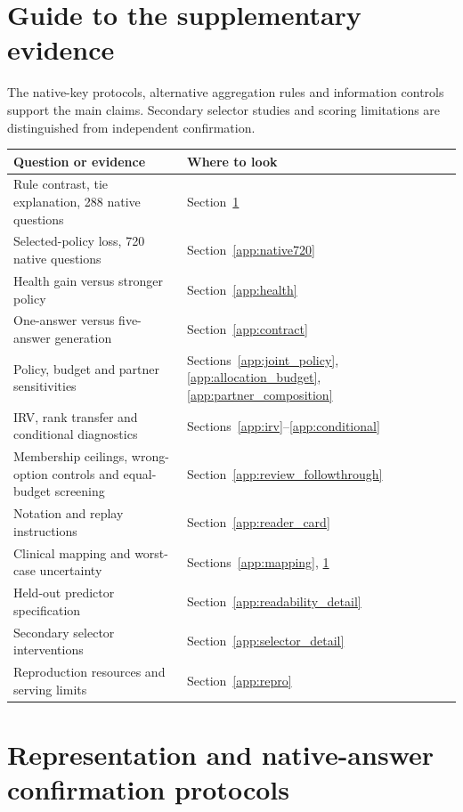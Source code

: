 \section*{Guide to the supplementary evidence}
The native-key protocols, alternative aggregation rules and information controls support the main claims. Secondary selector studies and scoring limitations are distinguished from independent confirmation.

\begin{center}\small
\begin{tabular}{>{\raggedright\arraybackslash}p{.55\linewidth}>{\raggedright\arraybackslash}p{.37\linewidth}}
\toprule
Question or evidence & Where to look\\
\midrule
Rule contrast, tie explanation, 288 native questions & Section~\ref{app:representation}\\
Selected-policy loss, 720 native questions & Section~\ref{app:native720}\\
Health gain versus stronger policy & Section~\ref{app:health}\\
One-answer versus five-answer generation & Section~\ref{app:contract}\\
Policy, budget and partner sensitivities & Sections~\ref{app:joint_policy}, \ref{app:allocation_budget}, \ref{app:partner_composition}\\
IRV, rank transfer and conditional diagnostics & Sections~\ref{app:irv}--\ref{app:conditional}\\
Membership ceilings, wrong-option controls and equal-budget screening & Section~\ref{app:review_followthrough}\\
Notation and replay instructions & Section~\ref{app:reader_card}\\
Clinical mapping and worst-case uncertainty & Sections~\ref{app:mapping}, \ref{app:representation}\\
Held-out predictor specification & Section~\ref{app:readability_detail}\\
Secondary selector interventions & Section~\ref{app:selector_detail}\\
Reproduction resources and serving limits & Section~\ref{app:repro}\\
\bottomrule
\end{tabular}
\end{center}


\section{Representation and native-answer confirmation protocols}\label{app:representation}
